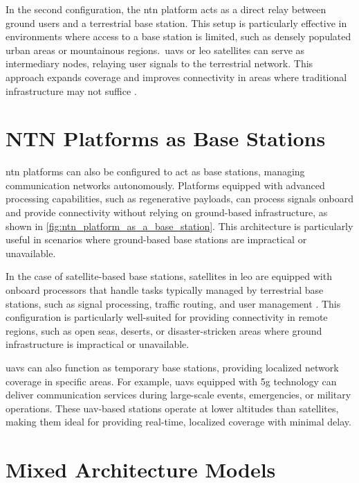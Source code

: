 In the second configuration, the \gls{ntn} platform acts as a direct relay between ground users and a terrestrial base station. This setup is particularly effective in environments where access to a base station is limited, such as densely populated urban areas or mountainous regions.\ \glspl{uav} or \gls{leo} satellites can serve as intermediary nodes, relaying user signals to the terrestrial network. This approach expands coverage and improves connectivity in areas where traditional infrastructure may not suffice \autocite{overview_on-5g-and-beyon-networks-with-uav}.

\section{NTN Platforms as Base Stations}\label{sec:ntn_platform_as_a_base_station}

\gls{ntn} platforms can also be configured to act as base stations, managing communication networks autonomously. Platforms equipped with advanced processing capabilities, such as regenerative payloads, can process signals onboard and provide connectivity without relying on ground-based infrastructure, as shown in \cref{fig:ntn_platform_as_a_base_station}. This architecture is particularly useful in scenarios where ground-based base stations are impractical or unavailable.

In the case of satellite-based base stations, satellites in \gls{leo} are equipped with onboard processors that handle tasks typically managed by terrestrial base stations, such as signal processing, traffic routing, and user management \autocite{leo_platforms_in_ntn}. This configuration is particularly well-suited for providing connectivity in remote regions, such as open seas, deserts, or disaster-stricken areas where ground infrastructure is impractical or unavailable.

\glspl{uav} can also function as temporary base stations, providing localized network coverage in specific areas. For example, \glspl{uav} equipped with \gls{5g} technology can deliver communication services during large-scale events, emergencies, or military operations. These \gls{uav}-based stations operate at lower altitudes than satellites, making them ideal for providing real-time, localized coverage with minimal delay.

\section{Mixed Architecture Models}\label{sec:mixed_architecture_models}

